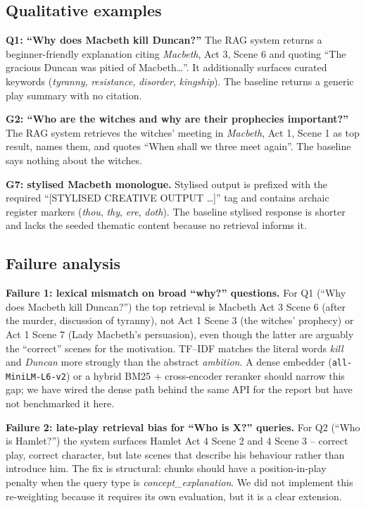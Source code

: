 \documentclass[10pt,twocolumn,a4paper]{article}
\begin{document}
\subsection{Qualitative examples}

\textbf{Q1: ``Why does Macbeth kill Duncan?''}
The RAG system returns a beginner-friendly explanation citing
\emph{Macbeth}, Act 3, Scene 6 and quoting
``The gracious Duncan was pitied of Macbeth\ldots''. It additionally
surfaces curated keywords (\emph{tyranny}, \emph{resistance},
\emph{disorder}, \emph{kingship}). The baseline returns a generic
play summary with no citation.

\textbf{G2: ``Who are the witches and why are their prophecies
important?''}
The RAG system retrieves the witches' meeting in
\emph{Macbeth}, Act 1, Scene 1 as top result, names them, and quotes
``When shall we three meet again''. The baseline says nothing about
the witches.

\textbf{G7: stylised Macbeth monologue.}
Stylised output is prefixed with the required ``[STYLISED CREATIVE
OUTPUT \ldots]'' tag and contains archaic register markers
(\emph{thou}, \emph{thy}, \emph{ere}, \emph{doth}). The baseline
stylised response is shorter and lacks the seeded thematic content
because no retrieval informs it.

\subsection{Failure analysis}
\label{sec:failure-analysis}

\textbf{Failure 1: lexical mismatch on broad ``why?'' questions.}
For Q1 (``Why does Macbeth kill Duncan?'') the top retrieval is
Macbeth Act 3 Scene 6 (after the murder, discussion of tyranny), not
Act 1 Scene 3 (the witches' prophecy) or Act 1 Scene 7 (Lady
Macbeth's persuasion), even though the latter are arguably the
``correct'' scenes for the motivation. TF--IDF matches the literal
words \emph{kill} and \emph{Duncan} more strongly than the abstract
\emph{ambition}. A dense embedder
(\verb|all-MiniLM-L6-v2|) or a hybrid BM25 + cross-encoder reranker
should narrow this gap; we have wired the dense path behind the same
API for the report but have not benchmarked it here.

\textbf{Failure 2: late-play retrieval bias for ``Who is X?'' queries.}
For Q2 (``Who is Hamlet?'') the system surfaces Hamlet Act 4 Scene 2
and 4 Scene 3 -- correct play, correct character, but late
scenes that describe his behaviour rather than introduce him. The
fix is structural: chunks should have a position-in-play penalty when
the query type is \emph{concept\_explanation}. We did not implement
this re-weighting because it requires its own evaluation, but it is
a clear extension.
\end{document}
